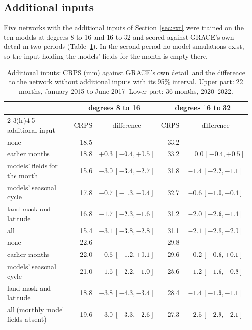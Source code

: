 \documentclass[11pt,a4paper]{article}
\begin{document}
\subsection{Additional inputs}\label{sec:extres}
Five networks with the additional inputs of Section~\ref{sec:ext} were trained on the ten
models at degrees 8 to 16 and 16 to 32 and scored against GRACE's own detail in two periods
(Table~\ref{tab:ext}). In the second period no model simulations exist, so the input holding
the models' fields for the month is empty there.

\begin{table}[ht]
\centering\small
\caption{Additional inputs: CRPS (mm) against GRACE's own detail, and the difference to the
network without additional inputs with its 95\% interval. Upper part: 22 months, January 2015
to June 2017. Lower part: 36 months, 2020--2022.}
\label{tab:ext}
\begin{tabular}{lrcrc}
  \toprule
  & \multicolumn{2}{c}{degrees 8 to 16} & \multicolumn{2}{c}{degrees 16 to 32} \\
  \cmidrule(lr){2-3}\cmidrule(lr){4-5}
  additional input & CRPS & difference & CRPS & difference \\
  \midrule
  none & 18.5 & & 33.2 & \\
  earlier months & 18.8 & $+0.3\ [-0.4, +0.5]$ & 33.2 & $\phantom{+}0.0\ [-0.4, +0.5]$ \\
  models' fields for the month & 15.6 & $-3.0\ [-3.4, -2.7]$ & 31.8 & $-1.4\ [-2.2, -1.1]$ \\
  models' seasonal cycle & 17.8 & $-0.7\ [-1.3, -0.4]$ & 32.7 & $-0.6\ [-1.0, -0.4]$ \\
  land mask and latitude & 16.8 & $-1.7\ [-2.3, -1.6]$ & 31.2 & $-2.0\ [-2.6, -1.4]$ \\
  all & 15.4 & $-3.1\ [-3.8, -2.8]$ & 31.1 & $-2.1\ [-2.8, -2.0]$ \\
  \midrule
  none & 22.6 & & 29.8 & \\
  earlier months & 22.0 & $-0.6\ [-1.2, +0.1]$ & 29.6 & $-0.2\ [-0.6, +0.1]$ \\
  models' seasonal cycle & 21.0 & $-1.6\ [-2.2, -1.0]$ & 28.6 & $-1.2\ [-1.6, -0.8]$ \\
  land mask and latitude & 18.8 & $-3.8\ [-4.3, -3.4]$ & 28.4 & $-1.4\ [-1.9, -1.1]$ \\
  all (monthly model fields absent) & 19.6 & $-3.0\ [-3.3, -2.6]$ & 27.3 & $-2.5\ [-2.9, -2.1]$ \\
  \bottomrule
\end{tabular}
\end{table}
\end{document}
